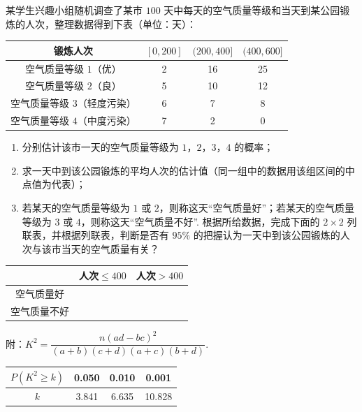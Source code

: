 \begin{problem}
某学生兴趣小组随机调查了某市 \(100\) 天中每天的空气质量等级和当天到某公园锻炼的人次，整理数据得到下表（单位：天）：

\begin{center}
\begin{tabular}{c|ccc}
锻炼人次 & \([0,200]\) & \((200,400]\) & \((400,600]\) \\
\hline
空气质量等级 \(1\)（优） & 2 & 16 & 25 \\
空气质量等级 \(2\)（良） & 5 & 10 & 12 \\
空气质量等级 \(3\)（轻度污染） & 6 & 7 & 8 \\
空气质量等级 \(4\)（中度污染） & 7 & 2 & 0
\end{tabular}
\end{center}

\begin{enumerate}
\item 分别估计该市一天的空气质量等级为 \(1\)，\(2\)，\(3\)，\(4\) 的概率；
\item 求一天中到该公园锻炼的平均人次的估计值（同一组中的数据用该组区间的中点值为代表）；
\item 若某天的空气质量等级为 \(1\) 或 \(2\)，则称这天“空气质量好”；若某天的空气质量等级为 \(3\) 或 \(4\)，则称这天“空气质量不好”. 根据所给数据，完成下面的 \(2\times2\) 列联表，并根据列联表，判断是否有 \(95\%\) 的把握认为一天中到该公园锻炼的人次与该市当天的空气质量有关？
\end{enumerate}

\begin{center}
\begin{tabular}{c|cc}
 & 人次\(\le400\) & 人次\(>400\) \\
\hline
空气质量好 &  &  \\
空气质量不好 &  &
\end{tabular}
\end{center}

附：\(K^2=\dfrac{n(ad-bc)^2}{(a+b)(c+d)(a+c)(b+d)}\).

\begin{center}
\begin{tabular}{c|ccc}
\(P(K^2\ge k)\) & 0.050 & 0.010 & 0.001 \\
\hline
\(k\) & 3.841 & 6.635 & 10.828
\end{tabular}
\end{center}
\end{problem}

